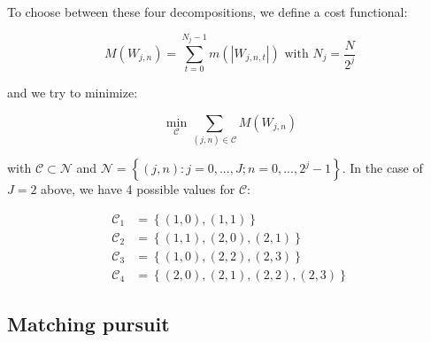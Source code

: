 \documentclass[methods.tex]{subfiles}
\begin{document}
To choose between these four decompositions, we define a cost functional:

\begin{equation}
M \left( W_{j,n} \right) = \sum_{t = 0}^{N_j - 1} m \left( \left\vert W_{j,n,t} \right\vert \right) \text{ with } N_j = \frac{N}{2^j}
\end{equation}

and we try to minimize:

\begin{equation}
\min_{\mathcal{C}} \sum_{\left( j,n \right) \in \mathcal{C}} M \left( W_{j,n} \right)
\end{equation}

with $\mathcal{C} \subset \mathcal{N}$ and $\mathcal{N} = \left\{ \left( j,n \right) : j = 0 , ... , J ; n = 0 , ... , 2^j - 1 \right\}$. In the case of $J = 2$ above, we have 4 possible values for $\mathcal{C}$:

\begin{align*}
\mathcal{C}_1 &= \left\{ \left( 1,0 \right) , \left( 1,1 \right) \right\} \\
\mathcal{C}_2 &= \left\{ \left( 1,1 \right) , \left( 2,0 \right) , \left( 2,1 \right) \right\} \\
\mathcal{C}_3 &= \left\{ \left( 1,0 \right) , \left( 2,2 \right) , \left( 2,3 \right) \right\} \\
\mathcal{C}_4 &= \left\{ \left( 2,0 \right) , \left( 2,1 \right) , \left( 2,2 \right) , \left( 2,3 \right) \right\}
\end{align*}

\subsection{Matching pursuit}
\end{document}

